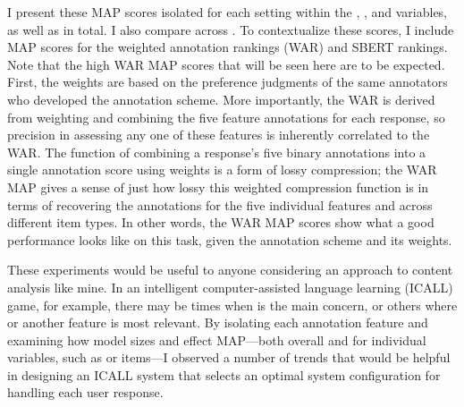 I present these MAP scores isolated for each setting within the , , and  variables, as well as in total. I also compare across . To contextualize these scores, I include MAP scores for the weighted annotation rankings (WAR) and SBERT rankings. Note that the high WAR MAP scores that will be seen here are to be expected. First, the weights are based on the preference judgments of the same annotators who developed the annotation scheme. More importantly, the WAR is derived from weighting and combining the five feature annotations for each response, so precision in assessing any one of these features is inherently correlated to the WAR. 
The function of combining a response's five binary annotations into a single annotation score using weights is a form of lossy compression; the WAR MAP gives a sense of just how lossy this weighted compression function is in terms of recovering the annotations for the five individual features and across different item types. In other words, the WAR MAP scores show what a good performance looks like on this task, given the annotation scheme and its weights. 

These experiments would be useful to anyone considering an approach to content analysis like mine. In an intelligent computer-assisted language learning (ICALL) game, for example, there may be times when  is the main concern, or others where  or another feature is most relevant. By isolating each annotation feature and examining how model sizes and  effect MAP---both overall and for individual variables, such as  or  items---I observed a number of trends that would be helpful in designing an ICALL system that selects an optimal system configuration for handling each user response.


